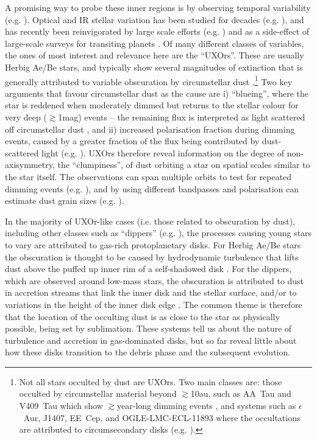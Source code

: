 \documentclass[]{rsos}
\begin{document}
A promising way to probe these inner regions is by observing temporal variability
(e.g. \cite{2014Sci...345.1032M}). Optical and IR stellar variation has been studied
for decades (e.g. \cite{1945ApJ...102..168J,1994AJ....108.1906H}), and has recently
been reinvigorated by large scale efforts
(e.g. \cite{2011ApJ...733...50M,2014AJ....147...82C}) and as a side-effect of
large-scale surveys for transiting planets
\cite{2012AJ....143...72M,2013AJ....146..112R,2016MNRAS.457.3988B}. Of many different
classes of variables, the ones of most interest and relevance here are the
``UXOrs''. These are usually Herbig Ae/Be stars, and typically show several magnitudes of
extinction that is generally attributed to variable obscuration by circumstellar dust
\cite{1994AJ....108.1906H,1999AJ....118.1043H,2000A&A...364..633N}.\footnote{Not all
  stars occulted by dust are UXOrs. Two main classes are: those occulted by circumstellar
  material beyond $\gtrsim$10au, such as AA~Tau and V409~Tau which show
  $\gtrsim$year-long dimming events \cite{2013A&A...557A..77B,2015AJ....150...32R}, and
  systems such as $\epsilon$~Aur, J1407, EE~Cep, and OGLE-LMC-ECL-11893 where the
  occultations are attributed to circumsecondary disks
  (e.g. \cite{1999MNRAS.303..521M,2012AJ....143...72M,2014ApJ...788...41D,2015ApJS..220...14K}).}
Two key arguments that favour circumstellar dust as the cause are i) ``blueing'', where
the star is reddened when moderately dimmed but returns to the stellar colour for very
deep ($\gtrsim$1mag) events -- the remaining flux is interpreted as light scattered off
circumstellar dust \cite{1988SvAL...14...27G}, and ii) increased polarisation fraction
during dimming events, caused by a greater fraction of the flux being contributed by
dust-scattered light (e.g. \cite{2001ARep...45...51R}). UXOrs therefore reveal
information on the degree of non-axisymmetry, the ``clumpiness'', of dust orbiting a star
on spatial scales similar to the star itself. The observations can span multiple orbits
to test for repeated dimming events (e.g. \cite{1999A&A...349..619B}), and by using
different bandpasses and polarisation can estimate dust grain sizes
(e.g. \cite{1988SvAL...14...27G,1994ASPC...62...63G}).

In the majority of UXOr-like cases (i.e. those related to obscuration by dust), including
other classes such as ``dippers''
(e.g. \cite{2014AJ....147...82C,2016ApJ...816...69A}), the processes causing young
stars to vary are attributed to gas-rich protoplanetary disks. For Herbig Ae/Be stars the
obscuration is thought to be caused by hydrodynamic turbulence that lifts dust above the
puffed up inner rim of a self-shadowed disk \cite{2003ApJ...594L..47D}. For the dippers,
which are observed around low-mass stars, the obscuration is attributed to dust in
accretion streams that link the inner disk and the stellar surface, and/or to variations
in the height of the inner disk edge
\cite{1999A&A...349..619B,2016ApJ...816...69A,2016arXiv160503985B}. The common theme is
therefore that the location of the occulting dust is as close to the star as physically
possible, being set by sublimation. These systems tell us about the nature of turbulence
and accretion in gas-dominated disks, but so far reveal little about how these disks
transition to the debris phase and the subsequent evolution.
\end{document}
